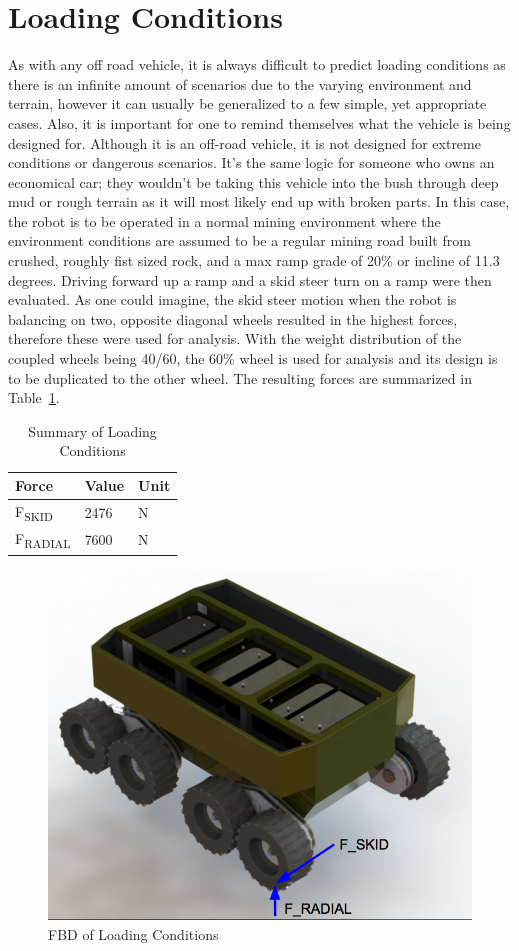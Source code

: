 \section{Loading Conditions}
As with any off road vehicle, it is always difficult to predict loading conditions as there is an infinite amount of scenarios due to the varying environment and terrain, however it can usually be generalized to a few simple, yet appropriate cases. Also, it is important for one to remind themselves what the vehicle is being designed for. Although it is an off-road vehicle, it is not designed for extreme conditions or dangerous scenarios. It's the same logic for someone who owns an economical car; they wouldn't be taking this vehicle into the bush through deep mud or rough terrain as it will most likely end up with broken parts. In this case, the robot is to be operated in a normal mining environment where the environment conditions are assumed to be a regular mining road built from crushed, roughly fist sized rock, and a max ramp grade of 20\% or incline of 11.3 degrees. Driving forward up a ramp and a skid steer turn on a ramp were then evaluated. As one could imagine, the skid steer motion when the robot is balancing on two, opposite diagonal wheels resulted in the highest forces, therefore these were used for analysis. With the weight distribution of the coupled wheels being 40/60, the 60\% wheel is used for analysis and its design is to be duplicated to the other wheel. The resulting forces are summarized in Table~\ref{tab:sumforces}.

\begin{table}[htbp]
	\centering
	\caption{Summary of Loading Conditions}
	\begin{tabular}{| p{5cm}ll |} \hline
		Force & Value & Unit \\ \hline
		F\textsubscript{SKID} & 2476 & N \\ \hline
		F\textsubscript{RADIAL} & 7600 & N \\ \hline
	\end{tabular}
	\label{tab:sumforces}
\end{table}

\begin{figure}[h]\centering
	\includegraphics[width=.7\linewidth]{images/loading_conditions.png}
	\caption{FBD of Loading Conditions}
	\label{fig:load_cond}
\end{figure}
   
